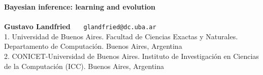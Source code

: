 \documentclass[a0,portrait]{a0poster} %
\begin{document}
% 
%  

\centering \fontsize{90}{90} \textbf{Bayesian inference: learning and  evolution} \\[0.4cm]  %
\fontsize{70}{85}\textbf{}\\[1cm] %
\LARGE \textbf{Gustavo Landfried}  \ \ \  \texttt{glandfried@dc.uba.ar} \\
\large 1. Universidad de Buenos Aires. Facultad de Ciencias Exactas y Naturales. Departamento de Computaci\'on. Buenos Aires, Argentina \\ 
\large 2. CONICET-Universidad de Buenos Aires. Instituto de Investigaci\'on en Ciencias de la Computaci\'on (ICC). Buenos Aires, Argentina \\


\vspace{1cm}
\end{document}
